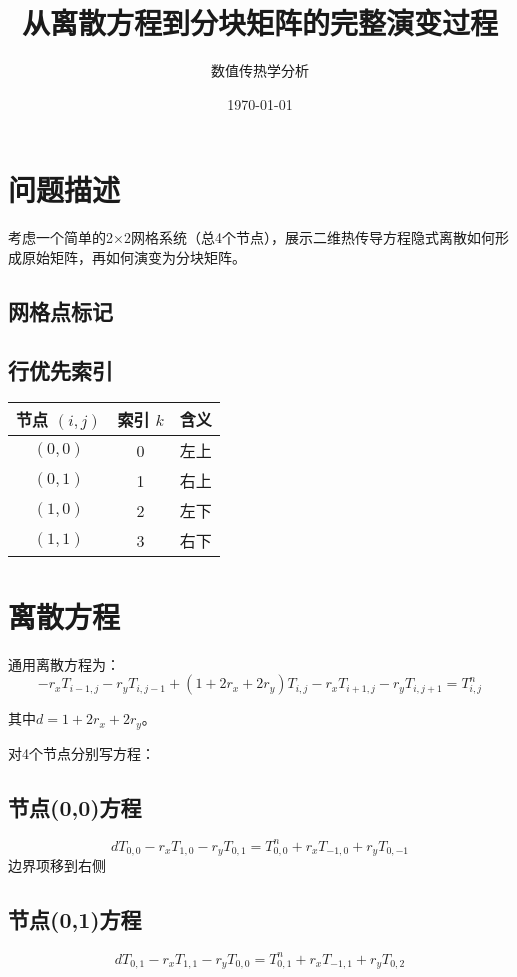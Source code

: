\documentclass[UTF8]{ctexart}
\title{从离散方程到分块矩阵的完整演变过程}
\author{数值传热学分析}
\date{\today}
\begin{document}
\maketitle

\section{问题描述}
考虑一个简单的2×2网格系统（总4个节点），展示二维热传导方程隐式离散如何形成原始矩阵，再如何演变为分块矩阵。

\subsection{网格点标记}

\subsection{行优先索引}
\begin{tabular}{c|c|c}
节点 $(i,j)$ & 索引 $k$ & 含义 \\ \hline
$(0,0)$ & 0 & 左上 \\
$(0,1)$ & 1 & 右上 \\
$(1,0)$ & 2 & 左下 \\
$(1,1)$ & 3 & 右下 \\
\end{tabular}

\section{离散方程}
通用离散方程为：
$$
-r_x T_{i-1,j} - r_y T_{i,j-1} + (1 + 2r_x + 2r_y) T_{i,j} - r_x T_{i+1,j} - r_y T_{i,j+1} = T_{i,j}^n
$$

其中$d = 1 + 2r_x + 2r_y$。

对4个节点分别写方程：

\subsection{节点(0,0)方程}
$$
d T_{0,0} - r_x T_{1,0} - r_y T_{0,1} = T_{0,0}^n + r_x T_{-1,0} + r_y T_{0,-1}
$$
边界项移到右侧

\subsection{节点(0,1)方程}
$$
d T_{0,1} - r_x T_{1,1} - r_y T_{0,0} = T_{0,1}^n + r_x T_{-1,1} + r_y T_{0,2}
$$
\end{document}
